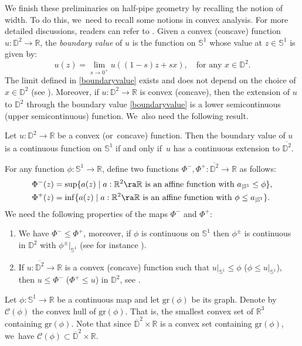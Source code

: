 We finish these preliminaries on half-pipe geometry by recalling the notion of width. To do this, we~need to recall some notions in convex analysis. For more detailed discussions, readers can refer to \cite{Rockconvex}.
Given a convex (\resp concave) function $u:\mathbb{D}^2\to \mathbb{R}$, the \emph{boundary value} of $u$ is the function on $\mathbb{S}^1$ whose value at $z\in\mathbb{S}^1$ is given by: \begin{equation}\label{boundaryvalue}
u(z) = \lim_{s \to 0^+}u((1-s)z+sx),\quad\text{for any } x\in\mathbb{D}^2.
\end{equation}
The limit defined in \eqref{boundaryvalue} exists and does not depend on the choice of $x\in \mathbb{D}^2$ (see \cite[\S 4]{ConvexAnal}). Moreover, if $u:\mathbb{D}^2\to\mathbb{R}$ is convex (\resp concave), then the extension of $u$ to $\overline{\mathbb{D}^2}$ through the boundary value \eqref{boundaryvalue} is a lower semicontinuous (\resp upper semicontinuous) function. We~also need the following result.
\begin{prop}
\label{boundaryvalueextension}
Let $u: \mathbb{D}^2\to\mathbb{R}$ be a convex (or~concave) function. Then the boundary value of $u$ is a continuous function on $\mathbb{S}^1$ if and only if~$u$ has a continuous extension to $\overline{\mathbb{D}^2}$.
\end{prop}
For any function $\phi: \mathbb{S}^1 \to \mathbb{R}$, define two functions $\Phi^-, \Phi^+: \overline{\mathbb{D}^2} \to \mathbb{R}$ as follows:\vspace*{-3pt}
\begin{align}\label{phi-}
\Phi^-(z)&=\sup\{ a(z)\mid a:\mathbb{R}^2\ra\mathbb{R} \text{ is an affine function with } a_{\mid\mathbb{S}^1}\leq\phi \},
\\
\label{phi+}
\Phi^+(z)&=\inf\{ a(z)\mid a:\mathbb{R}^2\ra\mathbb{R} \text{ is an affine function with } \phi\leq a_{\mid\mathbb{S}^1} \}.
\end{align}
We need the following properties of the maps $\Phi^-$ and $\Phi^+$:\label{page 8}
\begin{enumerate}
\item[(P1)]\label{P1}
We have $\Phi^-\leq\Phi^+$, moreover, if $\phi$ is continuous on $\mathbb{S}^1$ then $\phi^{\pm}$ is continuous in $\mathbb{D}^2$ with $\phi^{\pm}|_{\mathbb{S}^1}$ (see for instance \cite[Lem.\,4.6]{ConvexAnal}).
\item[(P2)]\label{P2} If $u:\overline{\mathbb{D}^2}\to\mathbb{R}$ is a convex (\resp concave) function such that $u |_{\mathbb{S}^1}\leq \phi$ (\resp $\phi\leq u |_{\mathbb{S}^1} $), then $u\leq\Phi^-$ (\resp $\Phi^+\leq u$) in $\mathbb{D}^2$, see \cite[Cor.\,4.5]{ConvexAnal}.
\end{enumerate}
Let $\phi:\mathbb{S}^1\to\mathbb{R}$ be a continuous map and let $\mathrm{gr}(\phi)$ be its graph. Denote by $\mathcal{C}(\phi)$ the convex hull of $\mathrm{gr}(\phi)$. That is, the smallest convex set of $\mathbb{R}^3$ containing $\mathrm{gr}(\phi)$. Note that since $\overline{\mathbb{D}}^2\times\mathbb{R}$ is a convex set containing $\mathrm{gr}(\phi)$, we~have $\mathcal{C}(\phi)\subset\overline{\mathbb{D}}^2\times\mathbb{R}$.


